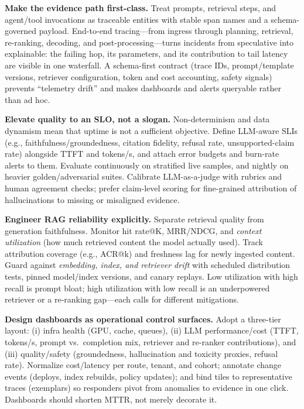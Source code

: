\medskip
\noindent\textbf{Make the evidence path first-class.}
Treat prompts, retrieval steps, and agent/tool invocations as traceable entities with stable span names and a schema-governed payload. End-to-end tracing---from ingress through planning, retrieval, re-ranking, decoding, and post-processing---turns incidents from speculative into explainable: the failing hop, its parameters, and its contribution to tail latency are visible in one waterfall. A schema-first contract (trace IDs, prompt/template versions, retriever configuration, token and cost accounting, safety signals) prevents ``telemetry drift'' and makes dashboards and alerts queryable rather than ad hoc.

\medskip
\noindent\textbf{Elevate quality to an SLO, not a slogan.}
Non-determinism and data dynamism mean that uptime is not a sufficient objective. Define LLM-aware SLIs (e.g., faithfulness/groundedness, citation fidelity, refusal rate, unsupported-claim rate) alongside TTFT and tokens/s, and attach error budgets and burn-rate alerts to them. Evaluate continuously on stratified live samples, and nightly on heavier golden/adversarial suites. Calibrate LLM-as-a-judge with rubrics and human agreement checks; prefer claim-level scoring for fine-grained attribution of hallucinations to missing or misaligned evidence.

\medskip
\noindent\textbf{Engineer RAG reliability explicitly.}
Separate retrieval quality from generation faithfulness. Monitor hit rate@K, MRR/NDCG, and \emph{context utilization} (how much retrieved content the model actually used). Track attribution coverage (e.g., ACR@k) and freshness lag for newly ingested content. Guard against \emph{embedding, index, and retriever drift} with scheduled distribution tests, pinned model/index versions, and canary replays. Low utilization with high recall is prompt bloat; high utilization with low recall is an underpowered retriever or a re-ranking gap—each calls for different mitigations.

\medskip
\noindent\textbf{Design dashboards as operational control surfaces.}
Adopt a three-tier layout: (i) infra health (GPU, cache, queues), (ii) LLM performance/cost (TTFT, tokens/s, prompt vs.\ completion mix, retriever and re-ranker contributions), and (iii) quality/safety (groundedness, hallucination and toxicity proxies, refusal rate). Normalize cost/latency per route, tenant, and cohort; annotate change events (deploys, index rebuilds, policy updates); and bind tiles to representative traces (exemplars) so responders pivot from anomalies to evidence in one click. Dashboards should shorten MTTR, not merely decorate it.

